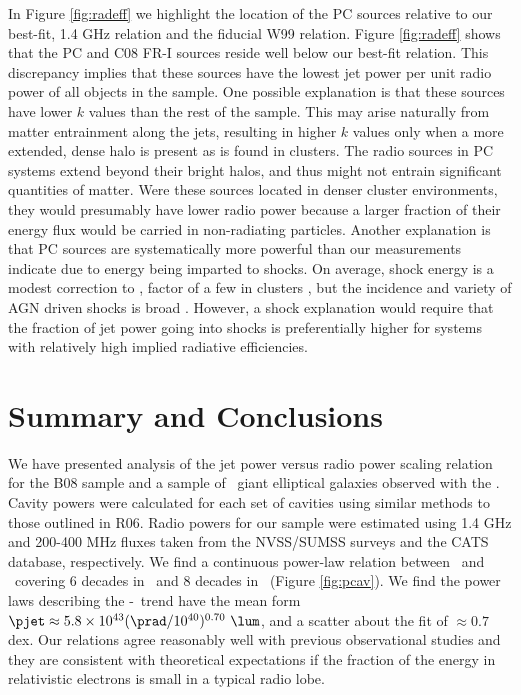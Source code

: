 \documentclass[12pt, preprint]{aastex}
\begin{document}
In Figure \ref{fig:radeff} we highlight the location of the PC sources
relative to our best-fit, 1.4 GHz relation and the fiducial W99
relation. Figure \ref{fig:radeff} shows that the PC and C08 FR-I
sources reside well below our best-fit relation. This discrepancy
implies that these sources have the lowest jet power per unit radio
power of all objects in the sample. One possible explanation is that
these sources have lower $k$ values than the rest of the sample. This
may arise naturally from matter entrainment along the jets, resulting
in higher $k$ values only when a more extended, dense halo is present
as is found in clusters. The radio sources in PC systems extend beyond
their bright halos, and thus might not entrain significant quantities
of matter. Were these sources located in denser cluster environments,
they would presumably have lower radio power because a larger fraction
of their energy flux would be carried in non-radiating
particles. Another explanation is that PC sources are systematically
more powerful than our measurements indicate due to energy being
imparted to shocks. On average, shock energy is a modest correction to
\pcav, factor of a few in clusters \citep{mcnamrev}, but the incidence
and variety of AGN driven shocks is broad
\citep[\eg][]{2003ApJ...592..129K, hydraa, herca,
  2003ApJ...592..129K}. However, a shock explanation would require
that the fraction of jet power going into shocks is preferentially
higher for systems with relatively high implied radiative
efficiencies.

\section{Summary and Conclusions}
\label{sec:summary}

We have presented analysis of the jet power versus radio power scaling
relation for the B08 sample and a sample of \samp\ giant elliptical
galaxies observed with the \cxo. Cavity powers were calculated for
each set of cavities using similar methods to those outlined in
R06. Radio powers for our sample were estimated using 1.4 GHz and
200-400 MHz fluxes taken from the NVSS/SUMSS surveys and the CATS
database, respectively. We find a continuous power-law relation
between \pjet\ and \prad\ covering 6 decades in \prad\ and 8 decades
in \pjet\ (Figure \ref{fig:pcav}). We find the power laws describing
the \pjet-\prad\ trend have the mean form $\pjet \approx 5.8 \times
10^{43} (\prad/10^{40})^{0.70} ~\lum$, and a scatter about the fit of
$\approx 0.7$ dex. Our relations agree reasonably well with previous
observational studies and they are consistent with theoretical
expectations if the fraction of the energy in relativistic electrons
is small in a typical radio lobe.
\end{document}
